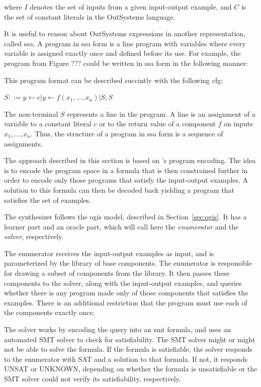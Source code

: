 
where $I$ denotes the set of inputs from a given input-output example, and
$C$ is the set of constant literals in the OutSystems language.

It is useful to reason about OutSystems expressions in another representation,
called \gls{ssa}. A program in \gls{ssa} form is a line program with variables
where every variable is assigned exactly once and defined before its use. For
example, the program from Figure ??? could be written in \gls{ssa} form in the
following manner:


This program format can be described succintly with the following \gls{cfg}:

$S ::= y \leftarrow c | y \leftarrow f(x_1, ..., x_n) | S;S$

The non-terminal $S$ represents a line in the program. A line is an assignment
of a variable to a constant literal $c$ or to the return value of a component
$f$ on inputs $x_1, ..., x_n$. Thus, the structure of a program in \gls{ssa}
form is a sequence of assignments.

The approach described in this section is based on
\citeauthor{Jha:oracle:2010}'s program encoding. The idea is to encode the
program space in a formula that is then constrained further in order to encode
only those programs that satisfy the input-output examples. A solution to this
formula can then be decoded back yielding a program that satisfies the set of
examples.

The synthesizer follows the \gls{ogis} model, described in
Section~\ref{sec:ogis}. It has a learner part and an oracle part, which will
call here the \textit{enumerator} and the \textit{solver}, respectively.

The enumerator receives the input-output examples as input, and is parameterized
by the library of base components. The enumerator is responsible for drawing a
subset of components from the library. It then passes these components to the
solver, along with the input-output examples, and queries whether there is any
program made only of those components that satisfies the examples. There is an
additional restriction that the program must use each of the components exactly
once.


The solver works by encoding the query into an \gls{smt} formula, and uses an
automated SMT solver to check for satisfiability. The SMT solver might or might
not be able to solve the formula. If the formula is satisfiable, the solver
responds to the enumerator with SAT and a solution to that formula. If not, it
responds UNSAT or UNKNOWN, depending on whether the formula is unsatisfiable or
the SMT solver could not verify its satisfiability, respectively.

